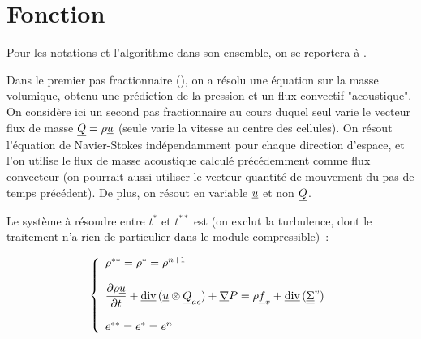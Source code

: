 
%
%
%
%


%
\vspace{1cm}
\section*{Fonction}

Pour les notations et l'algorithme dans son ensemble,
on se reportera à .

Dans le premier pas fractionnaire (), on a résolu une
équation sur la masse volumique, obtenu une prédiction de la pression
et un flux convectif "acoustique".
On considère ici un second pas fractionnaire au cours duquel seul varie
le vecteur flux de masse $\underline{Q}=\rho\underline{u}$
(seule varie la vitesse au centre des cellules).
On résout l'équation de Navier-Stokes indépendamment
pour chaque direction d'espace, et l'on utilise le flux de masse acoustique
calculé précédemment comme flux convecteur (on pourrait aussi utiliser
le vecteur quantité de mouvement du pas de temps précédent).
De plus, on résout en variable $\underline{u}$ et non $\underline{Q}$.

Le système à résoudre entre $t^*$ et $t^{**}$ est (on exclut
la turbulence, dont le traitement n'a rien de particulier dans le
module compressible)~:

\begin{equation}\label{Cfbl_Cfqdmv_eq_qdm_cfqdmv}
\left\{\begin{array}{l}

\rho^{**}=\rho^{*}=\rho^{n+1}\\
\\
\displaystyle\frac{\partial \rho\underline{u}}{\partial t}+
\underline{\text{div}}\,(\underline{u} \otimes \underline{Q}_{ac}) + \underline{\nabla}{P}
= \rho \underline{f}_v + \underline{\text{div}}\,(\underline{\underline{\Sigma}}^v)\\
\\
e^{**}=e^{*}=e^n\\

\end{array}\right.
\end{equation}

